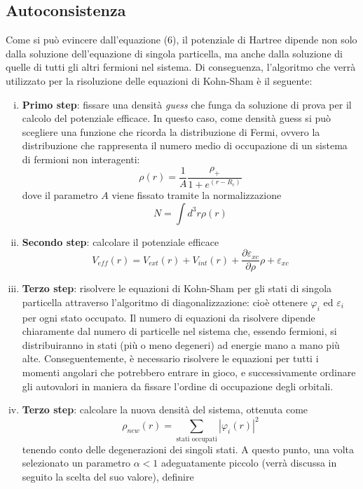 \documentclass[11pt,a4paper]{article}
\begin{document}
\subsection{Autoconsistenza}
Come si può evincere dall'equazione (6), il potenziale di Hartree dipende non solo dalla soluzione dell'equazione di singola particella, ma anche dalla soluzione di quelle di tutti gli altri fermioni nel sistema. Di conseguenza, l'algoritmo che verrà utilizzato per la risoluzione delle equazioni di Kohn-Sham è il seguente:
\begin{enumerate}[i.]
\item \textbf{Primo step}: fissare una densità \emph{guess} che funga da soluzione di prova per il calcolo del potenziale efficace. In questo caso, come densità guess si può scegliere una funzione che ricorda la distribuzione di Fermi, ovvero la distribuzione che rappresenta il numero medio di occupazione di un sistema di fermioni non interagenti:
\begin{equation}
\rho(r) = \frac{1}{A} \frac{\rho_+}{1+e^{(r-R_c)}}
\end{equation}
dove il parametro $A$ viene fissato tramite la normalizzazione
\[
N = \int d^3r \rho(r)
\]
\item \textbf{Secondo step}: calcolare il potenziale efficace
\[
V_{eff}(r) = V_{ext}(r)+V_{int}(r) + \frac{\partial \varepsilon_{xc}}{\partial \rho}\rho + \varepsilon_{xc}
\]
\item \textbf{Terzo step}: risolvere le equazioni di Kohn-Sham per gli stati di singola particella attraverso l'algoritmo di diagonalizzazione: cioè ottenere $\varphi_i$ ed $\varepsilon_i$ per ogni stato occupato. Il numero di equazioni da risolvere dipende chiaramente dal numero di particelle nel sistema che, essendo fermioni, si distribuiranno in stati (più o meno degeneri) ad energie mano a mano più alte. Conseguentemente, è necessario risolvere le equazioni per tutti i momenti angolari che potrebbero entrare in gioco, e successivamente ordinare gli autovalori in maniera da fissare l'ordine di occupazione degli orbitali. 
\item \textbf{Terzo step}: calcolare la nuova densità del sistema, ottenuta come
\begin{equation}
\rho_{new}(r) = \sum_{\text{stati occupati}} |\varphi_i(r)|^2
\end{equation}
tenendo conto delle degenerazioni dei singoli stati. A questo punto, una volta selezionato un parametro $\alpha < 1$ adeguatamente piccolo (verrà discussa in seguito la scelta del suo valore), definire

\end{enumerate}
\end{document}
